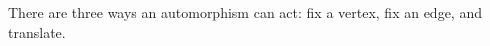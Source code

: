 \documentclass[preview]{standalone}
\begin{document}
\begin{center}
There are three ways an automorphism can act: fix a vertex, fix an edge, and translate.
\end{center}
\end{document}
